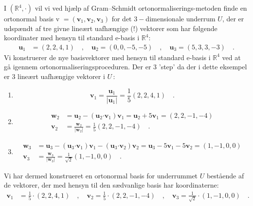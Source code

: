 \begin{example} \label{exampLAbog8.11}
I $(\mathbb{R}^{4}, {\bm{\cdot}})$ vil vi ved hjælp af Gram--Schmidt ortonormaliserings-metoden finde en ortonormal basis v $= ( \mathbf{v}_{1}, \mathbf{v}_{2}, \mathbf{v}_{3})$ for det $3-$dimensionale underrum $U$, der er udspændt af tre givne lineært uafhængige (!) vektorer som har følgende koordinater med hensyn til standard e-basis i $\mathbb{R}^{4}$:
\begin{equation*}
\begin{aligned}
\mathbf{u}_{1} &= (2,2,4,1) \quad , \quad \mathbf{u}_{2} = {(0,0,-5,-5)} \quad , \quad \mathbf{u}_{3} = {(5,3,3,-3)} \quad .
\end{aligned}
\end{equation*}
Vi konstruerer de nye basisvektorer med hensyn til standard e-basis i $\mathbb{R}^{4}$ ved at gå igennem ortonormaliseringsproceduren. Der er $3$ 'step' da der i dette eksempel er $3$ lineært uafhængige vek\-to\-rer i $U$\,:
\begin{enumerate}
\item
\begin{equation}
\mathbf{v}_{1} = \frac{\mathbf{u}_{1}}{\vert \mathbf{u}_{1} \vert} = \frac{1}{5}(2,2,4,1) \quad .
\end{equation}
\item
\begin{equation}
\begin{aligned}
\mathbf{w}_{2} &= \mathbf{u}_{2} - \left(\mathbf{u}_{2}\bm{\cdot}\mathbf{v}_{1}\right)\mathbf{v}_{1} = \mathbf{u}_{2} + 5\mathbf{v}_{1} = (2,2,-1,-4)\\
\mathbf{v}_{2} &= \frac{\mathbf{w}_{2}}{\vert \mathbf{w}_{2} \vert} = \frac{1}{5}(2,2,-1, -4) \quad .
\end{aligned}
\end{equation}
\item
\begin{equation}
\begin{aligned}
\mathbf{w}_{3} &= \mathbf{u}_{3} - \left(\mathbf{u}_{3}\bm{\cdot}\mathbf{v}_{1}\right)\mathbf{v}_{1} - \left(\mathbf{u}_{3}\bm{\cdot}\mathbf{v}_{2}\right)\mathbf{v}_{2} = \mathbf{u}_{3} - 5\mathbf{v}_{1} - 5\mathbf{v}_{2} = (1,-1,0,0)\\
\mathbf{v}_{3} &= \frac{\mathbf{w}_{3}}{\vert \mathbf{w}_{3} \vert} = \frac{1}{\sqrt{2}}(1,-1,0,0) \quad .
\end{aligned}
\end{equation}
\end{enumerate}
Vi har dermed konstrueret en ortonormal basis for underrummet $U$ bestående af de vektorer, der med hensyn til den sædvanlige basis har koordinaterne:
\begin{equation*}
\begin{aligned}
\mathbf{v}_{1} &= \frac{1}{5}\cdot(2,2,4,1) \quad , \quad \mathbf{v}_{2} = \frac{1}{5}\cdot(2,2,-1,-4) \quad , \quad \mathbf{v}_{3} = \frac{1}{\sqrt{2}}\cdot(1,-1,0,0) \quad .
\end{aligned}
\end{equation*}


\end{example}
